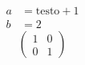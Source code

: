 \begin{align*}
a&=\text{testo}+1\\
b&=2
\end{align*}
\begin{equation}
\begin{pmatrix}1&0\\0&1\end{pmatrix}
\end{equation}
